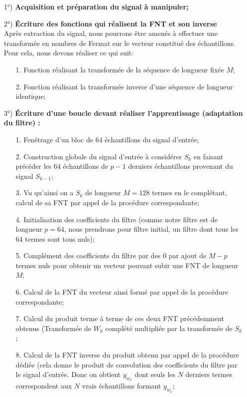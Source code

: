 \begin{itemize}
\item[1°)] \textbf{Acquisition et préparation du signal à manipuler;}\\
\item[2°)] \textbf{Écriture des fonctions qui réalisent la FNT et son inverse}\\
Après extraction du signal, nous pourrons être amenés à effectuer une transformée en nombres de Fermat sur le vecteur constitué des échantillons. Pour cela, nous devons réaliser ce qui suit:
\begin{itemize}
\item[1.] Fonction réalisant la transformée de la séquence de longueur fixée $ M $;
\item[2.] Fonction réalisant la transformée inverse d'une séquence de longueur identique;
\end{itemize}\newpage
\item[3°)] \textbf{Écriture d'une boucle devant réaliser l'apprentissage (adaptation du filtre) :}
\begin{itemize}
\item[1.] Fenêtrage d'un bloc de $ 64 $ échantillons du signal d'entrée;
\item[2.] Construction globale du signal d'entrée à considérer $ S_{k} $ en faisant précéder les $ 64 $ échantillons de $ p-1 $ derniers échantillons provenant du signal $ S_{k-1} $;
\item[3.] Vu qu'ainsi on a $ S_{k} $ de longueur $ M=128 $ termes en le complétant, calcul de sa FNT par appel de la procédure correspondante;
\item[4.] Initialisation des coefficients du filtre (comme notre filtre est de longueur $ p=64 $, nous prendrons pour filtre initial, un filtre dont tous les $ 64 $ termes sont tous nuls);
\item[5.] Complément des coefficients du filtre par des 0 par ajout de $ M-p $ termes nuls pour obtenir un vecteur pouvant subir une FNT de longueur $ M $;
\item[6.] Calcul de la FNT du vecteur ainsi formé par appel de la procédure correspondante;
\item[7.] Calcul du produit terme à terme de ces deux FNT précédemment obtenus (Transformée de $ W_{k} $ complété multipliée par la transformée de $ S_{k} $;
\item[8.] Calcul de la FNT inverse du produit obtenu par appel de la procédure dédiée (cela donne le produit de convolution des coefficients du filtre par le signal d'entrée. Donc on obtient $ y_{w_{k}} $ dont seuls les $ N $ derniers termes correspondent aux $ N $ vrais échantillons formant $ y_{w_{k}} $;

\end{itemize}
\end{itemize}
